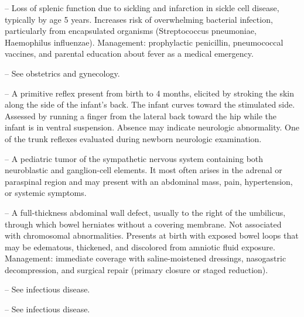 -- Loss of splenic function due to sickling and infarction in sickle cell disease, typically by age 5 years. Increases risk of overwhelming bacterial infection, particularly from encapsulated organisms (Streptococcus pneumoniae, Haemophilus influenzae). Management: prophylactic penicillin, pneumococcal vaccines, and parental education about fever as a medical emergency.

-- See obstetrics and gynecology.

-- A primitive reflex present from birth to 4 months, elicited by stroking the skin along the side of the infant's back. The infant curves toward the stimulated side. Assessed by running a finger from the lateral back toward the hip while the infant is in ventral suspension. Absence may indicate neurologic abnormality. One of the trunk reflexes evaluated during newborn neurologic examination.

-- A pediatric tumor of the sympathetic nervous system containing both neuroblastic and ganglion-cell elements. It most often arises in the adrenal or paraspinal region and may present with an abdominal mass, pain, hypertension, or systemic symptoms.

-- A full-thickness abdominal wall defect, usually to the right of the umbilicus, through which bowel herniates without a covering membrane. Not associated with chromosomal abnormalities. Presents at birth with exposed bowel loops that may be edematous, thickened, and discolored from amniotic fluid exposure. Management: immediate coverage with saline-moistened dressings, nasogastric decompression, and surgical repair (primary closure or staged reduction).

-- See infectious disease.

-- See infectious disease.

